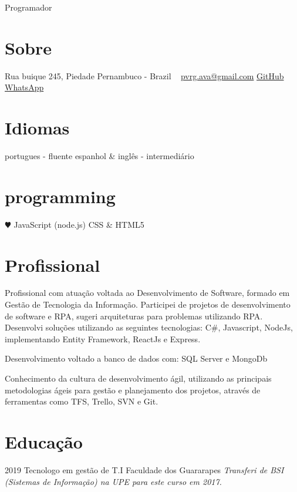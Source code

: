 \documentclass[]{friggeri-cv}
\begin{document}
       {Programador}


\begin{aside}
  \section{Sobre}
    Rua buique
    245, Piedade
    Pernambuco - Brazil
    ~
    \href{mailto:pvrg.ava@gmail.com}{pvrg.ava@gmail.com}
    \href{https://github.com/paulorodrigues99}{GitHub}
    \href{http://wa.me/5581995261010}{WhatsApp}
  \section{Idiomas}
    portugues - fluente
    espanhol \& inglês - intermediário
  \section{programming}
    {\color{red} $\varheartsuit$} JavaScript
    (node.js)
    CSS \& HTML5
\end{aside}

\section{Profissional}

Profissional com atuação voltada ao Desenvolvimento de Software, formado em Gestão de Tecnologia da Informação. Participei de projetos de desenvolvimento de software e RPA, sugeri arquiteturas para problemas utilizando RPA.
Desenvolvi soluções utilizando as seguintes tecnologias: C#, Javascript, NodeJs, implementando Entity Framework, ReactJs e Express.

Desenvolvimento voltado a banco de dados com: SQL Server e MongoDb

Conhecimento da cultura de desenvolvimento ágil, utilizando as principais metodologias ágeis para gestão e planejamento dos projetos, através de ferramentas como TFS, Trello, SVN e Git. 

\section{Educação}

\begin{entrylist}
  \entry
    {2019}
    {Tecnologo {\normalfont em gestão de T.I}}
    {Faculdade dos Guararapes}
    {\emph{Transferi de BSI (Sistemas de Informação) na UPE para este curso em 2017.}}
\end{entrylist}
\end{document}
